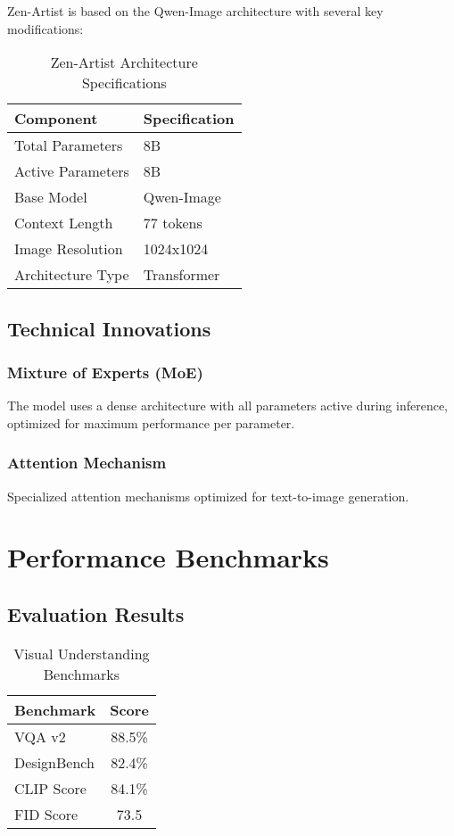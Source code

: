 \documentclass[11pt,a4paper]{article}
\begin{document}
Zen-Artist is based on the Qwen-Image architecture with several key modifications:

\begin{table}[H]
\centering
\begin{tabular}{ll}
\toprule
\textbf{Component} & \textbf{Specification} \\
\midrule
Total Parameters & 8B \\
Active Parameters & 8B \\
Base Model & Qwen-Image \\
Context Length & 77 tokens \\

Image Resolution & 1024x1024 \\

Architecture Type & Transformer \\
\bottomrule
\end{tabular}
\caption{Zen-Artist Architecture Specifications}
\end{table}

\subsection{Technical Innovations}

\subsubsection{Mixture of Experts (MoE)}
The model uses a dense architecture with all parameters active during inference, optimized for maximum performance per parameter.

\subsubsection{Attention Mechanism}
Specialized attention mechanisms optimized for text-to-image generation.



\section{Performance Benchmarks}

\subsection{Evaluation Results}


\begin{table}[H]
\centering
\begin{tabular}{lc}
\toprule
\textbf{Benchmark} & \textbf{Score} \\
\midrule
VQA v2 & 88.5\% \\
DesignBench & 82.4\% \\
CLIP Score & 84.1\% \\
FID Score & 73.5 \\
\bottomrule
\end{tabular}
\caption{Visual Understanding Benchmarks}
\end{table}
\end{document}
